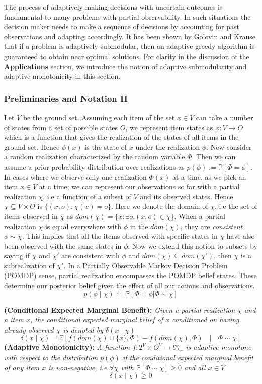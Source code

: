 The process of adaptively making decisions with uncertain outcomes is fundamental to many problems with partial observability. In such situations the decision maker needs to make a sequence of decisions by accounting for past observations and adapting accordingly. It has been shown by Golovin and Krause \cite{Golovin} that if a problem is adaptively submodular, then an adaptive greedy algorithm is guaranteed to obtain near optimal solutions.
For clarity in the discussion of the \textbf{Applications} section, we introduce the notion of adaptive submodularity and adaptive monotonicity in this section.

\subsubsection{Preliminaries and Notation II}
Let $V$ be the ground set. Assuming each item of the set $x\in V$ can take a number of states from a set of possible states $O$, we represent item states as $\phi:V \rightarrow O$ which is a function that gives the realization of the states of all items in the ground set. Hence $\phi(x)$ is the state of $x$ under the realization $\phi$. Now consider a random realization characterized by the random variable $\Phi$. Then we can assume a prior probability distribution over realizations as $p(\phi) := \mathbb{P}[\Phi = \phi]$. 
In cases where we observe only one realization $\Phi(x)$ at a time, as we pick an item $x \in V$ at a time; we can represent our observations so far with a partial realization $\chi$, i.e a function of a subset of $V$ and its observed states. Hence $\chi \subseteq V \times O$ is $\{(x,o):\chi(x) = o\}$. Here we denote the domain of $\chi$, i.e the set of items observed in $\chi$ as $dom(\chi) = \{ x: \exists o.(x,o) \in \chi \}$. When a partial realization $\chi$ is equal everywhere with $\phi$ in the $dom(\chi)$, they are {\it consistent} $\phi \sim \chi$.
This implies that all the items observed with specific states in $\chi$ have also been observed with the same states in $\phi$. Now we extend this notion to subsets by saying if $\chi$ and $\chi'$ are consistent with $\phi$ and $dom(\chi)\subseteq dom(\chi')$, then $\chi$ is a subrealization of $\chi'$. In a Partially Observable Markov Decision Problem (POMDP) sense, partial realization encompasses the POMDP belief states. These determine our posterior belief given the effect of all our actions and observations.
\[
 p(\phi\mid\chi) := \mathbb{P}[\Phi=\phi | \Phi \sim \chi]
\]

{\bf {} (Conditional Expected Marginal Benefit):} 
{\it Given a partial realization $\chi$ and a item $x$, the conditional expected marginal belief of $x$ conditioned on having already observed $\chi$ is denoted by $\delta(x\mid\chi)$
\[
 \delta(x\mid\chi) = \mathbb{E}[f(dom(\chi)\cup\{x\},\Phi) - f(dom(\chi),\Phi) \text{ } \mid \text{ } \Phi \sim \chi]
\]
}
{\bf {} (Adaptive Monotonicity):}
{\it A function $f:2^V \times O^V \rightarrow \Re_+$ is adaptive monotone with respect to the distribution $p(\phi)$ if the conditional expected marginal benefit of any item $x$ is non-negative, i.e $\forall \chi$ with $\mathbb{P}[\Phi \sim \chi] \geq 0$ and all $x\in V$ }
\[
 \delta(x\mid\chi) \geq 0
\]

